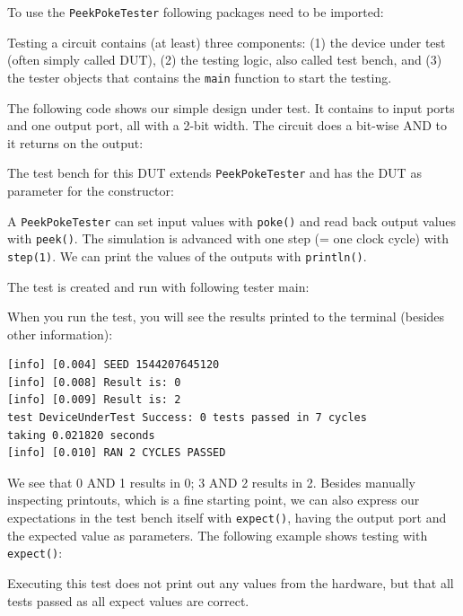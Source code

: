 \documentclass[%
    10pt, %
    headinclude, footexclude,
    openright, %
    notitlepage,
    cleardoubleempty,
    headsepline,
    pointlessnumbers,
    bibtotoc, idxtotoc,
    ]{scrbook}
\newcommand{\code}[1]{{\small{\texttt{#1}}}}
\begin{document}
To use the \code{PeekPokeTester} following packages need to be imported:



\noindent Testing a circuit contains (at least) three components: (1) the device under test (often
simply called DUT), (2) the testing logic, also called test bench, and (3) the tester objects
that contains the \code{main} function to start the testing.

The following code shows our simple design under test. It contains to input
ports and one output port, all with a 2-bit width. The circuit does a bit-wise AND
to it returns on the output:



\noindent The test bench for this DUT extends \code{PeekPokeTester} and has
the DUT as parameter for the constructor:



\noindent A \code{PeekPokeTester} can set input values with \code{poke()} and
read back output values with \code{peek()}. The simulation is advanced with one
step (= one clock cycle) with \code{step(1)}.
We can print the values of the outputs with \code{println()}.

The test is created and run with following tester main:



\noindent When you run the test, you will see the results printed to the terminal
(besides other information):

\begin{verbatim}
[info] [0.004] SEED 1544207645120
[info] [0.008] Result is: 0
[info] [0.009] Result is: 2
test DeviceUnderTest Success: 0 tests passed in 7 cycles
taking 0.021820 seconds
[info] [0.010] RAN 2 CYCLES PASSED
\end{verbatim}

\noindent We see that 0 AND 1 results in 0; 3 AND 2 results in 2.
Besides manually inspecting printouts, which is a fine starting point, we can also
express our expectations in the test bench itself with \code{expect()},
having the output port and the expected value as parameters.
The following example shows testing with \code{expect()}:



\noindent Executing this test does not print out any values from the hardware,
but that all tests passed as all expect values are correct.
\end{document}
